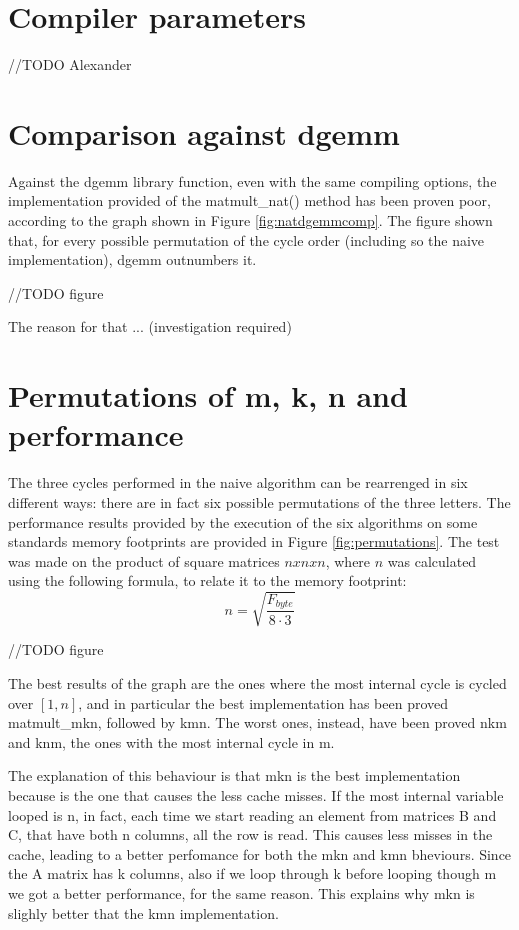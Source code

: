 \section{Compiler parameters}

//TODO Alexander
 
\section{Comparison against dgemm}

Against the dgemm library function, even with the same compiling options, the implementation provided of the matmult\_nat() method has been proven poor, according to the graph shown in Figure \ref{fig:natdgemmcomp}. The figure shown that, for every possible permutation of the cycle order (including so the naive implementation), dgemm outnumbers it.

//TODO figure

The reason for that ... (investigation required)

\section{Permutations of m, k, n and performance}
The three cycles performed in the naive algorithm can be rearrenged in six different ways: there are in fact six possible permutations of the three letters. The performance results provided by the execution of the six algorithms on some standards memory footprints are provided in Figure \ref{fig:permutations}. The test was made on the product of square matrices $nxnxn$, where $n$ was calculated using the following formula, to relate it to the memory footprint:
$$
n = \sqrt{\frac{F_{byte}}{8 \cdot 3} }
$$

//TODO figure

The best results of the graph are the ones where the most internal cycle is cycled over $[1,n]$, and in particular the best implementation has been proved matmult\_mkn, followed by kmn. The worst ones, instead, have been proved nkm and knm, the ones with the most internal cycle in m.

The explanation of this behaviour is that mkn is the best implementation because is the one that causes the less cache misses. If the most internal variable looped is n, in fact, each time we start reading an element from matrices B and C, that have both n columns, all the row is read. This causes less misses in the cache, leading to a better perfomance for both the mkn and kmn bheviours. Since the A matrix has k columns, also if we loop through k before looping though m we got a better performance, for the same reason. This explains why mkn is slighly better that  the kmn implementation.

